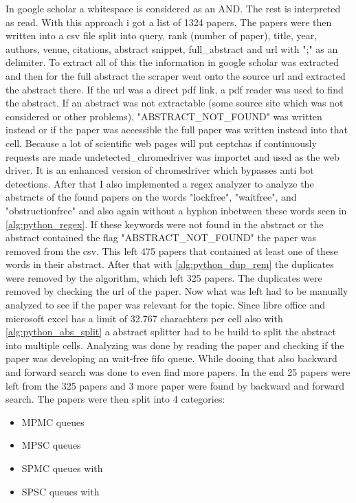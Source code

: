 In google scholar a whitespace is considered as an AND. The rest is interpreted as read. With this approach i got a list of 1324 papers. The papers were then written into a csv file split into query, rank (number of paper), title, year, authors, venue, citations, abstract snippet, full\_abstract and url with ";" as an delimiter. To extract all of this the information in google scholar was extracted and then for the full abstract the scraper went onto the source url and extracted the abstract there. If the url was a direct pdf link, a pdf reader was used to find the abstract. If an abstract was not extractable (some source site which was not considered or other problems), "ABSTRACT\_NOT\_FOUND" was written instead or if the paper was accessible the full paper was written instead into that cell. Because a lot of scientific web pages will put ceptchas if continuously requests are made undetected\_chromedriver was importet and used as the web driver. It is an enhanced version of chromedriver which bypasses anti bot detections. After that I also implemented a regex analyzer to analyze the abstracts of the found papers on the words "lock\-free", "wait\-free", and "obstruction\-free" and also again without a hyphon inbetween these words seen in \cref{alg:python_regex}. If these keywords were not found in the abstract or the abstract contained the flag "ABSTRACT\_NOT\_FOUND" the paper was removed from the csv. This left 475 papers that contained at least one of these words in their abstract. After that with \cref{alg:python_dup_rem} the duplicates were removed by the algorithm, which left 325 papers. The duplicates were removed by checking the url of the paper. Now what was left had to be manually analyzed to see if the paper was relevant for the topic. Since libre office and microsoft excel has a limit of 32.767 charachters per cell also with \cref{alg:python_abs_split} a abstract splitter had to be build to split the abstract into multiple cells. Analyzing was done by reading the paper and checking if the paper was developing an wait-free fifo queue. While dooing that also backward and forward search was done to even find more papers. In the end 25 papers were left from the 325 papers and 3 more paper were found by backward and forward search. The papers were then split into 4 categories:
\begin{itemize}
   \item \ac{MPMC} queues \cite{Kogan2011WaitFreeQueues,FeldmanDechev2015WaitFreeRingBuffer,kogan2012methodology,StellwegQueue,FeldmanDechevV2,FeldmanDechevV3,RamalheteQueue,wCQWaitFreeQueue,naderibeni2023waitfreequeuepolylogarithmicstep,johnen_et_al:LIPIcs.OPODIS.2022.4,Naderibeni2022WaitFree,Bedin2024WaitFreeBurden,Verma2013Scalable,KhanchandaniQueuePrimitives,FastFetchAndAddWaitFreeQueue}
   \item \ac{MPSC} queues \cite{WangCacheCoherent,adampsc,jiffy,JayantiLog,Drescher2015GuardedSections}
   \item \ac{SPMC} queues with \cite{Mateíspmc}
   \item \ac{SPSC} queues with \cite{Lamport1983SPSCCircularBuffer,torquati2010singleproducersingleconsumerqueuessharedcache,Aldinucci2012EfficientSync,Wang2013BQueue,DehnaviQueue,MaffioneCacheAware,ffq}
\end{itemize}
